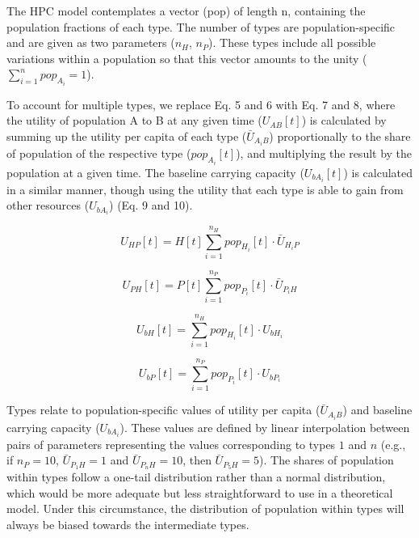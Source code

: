 \documentclass[
]{book}
\begin{document}
The HPC model contemplates a vector (pop) of length n, containing the population fractions of each type. The number of types are population-specific and are given as two parameters (\(n_{H}\), \(n_{P}\)). These types include all possible variations within a population so that this vector amounts to the unity (\(\sum_{i=1}^{n}{pop_{A_{i}}}=1\)).

To account for multiple types, we replace Eq. 5 and 6 with Eq. 7 and 8, where the utility of population A to B at any given time (\(U_{AB}[t]\)) is calculated by summing up the utility per capita of each type (\(\bar{U}_{A_{i}B}\)) proportionally to the share of population of the respective type (\(pop_{A_{i}}[t]\)), and multiplying the result by the population at a given time. The baseline carrying capacity (\(U_{bA_{i}}[t]\)) is calculated in a similar manner, though using the utility that each type is able to gain from other resources (\(U_{bA_{i}}\)) (Eq. 9 and 10).

\begin{equation}
\tag{Eq. 7}
U_{HP}[t]=H[t]\sum_{i=1}^{n_{H}}{pop_{H_{i}}[t]\cdot \bar{U}_{H_{i}P}}
\end{equation}

\begin{equation}
\tag{Eq. 8}
U_{PH}[t]=P[t]\sum_{i=1}^{n_{P}}{pop_{P_{i}}[t]\cdot \bar{U}_{P_{i}H}}
\end{equation}

\begin{equation}
\tag{Eq. 9}
U_{bH}[t]=\sum_{i=1}^{n_{H}}{pop_{H_{i}}[t]\cdot U_{bH_{i}}}
\end{equation}

\begin{equation}
\tag{Eq. 10}
U_{bP}[t]=\sum_{i=1}^{n_{P}}{pop_{P_{i}}[t]\cdot U_{bP_{i}}}
\end{equation}

Types relate to population-specific values of utility per capita (\(\bar{U}_{A_{i}B}\)) and baseline carrying capacity (\(U_{bA_{i}}\)). These values are defined by linear interpolation between pairs of parameters representing the values corresponding to types \(1\) and \(n\) (e.g., if \(n_P=10\), \(\bar{U}_{P_{1}H}=1\) and \(\bar{U}_{P_{n}H}=10\), then \(\bar{U}_{P_{5}H}=5\)). The shares of population within types follow a one-tail distribution rather than a normal distribution, which would be more adequate but less straightforward to use in a theoretical model. Under this circumstance, the distribution of population within types will always be biased towards the intermediate types.
\end{document}
